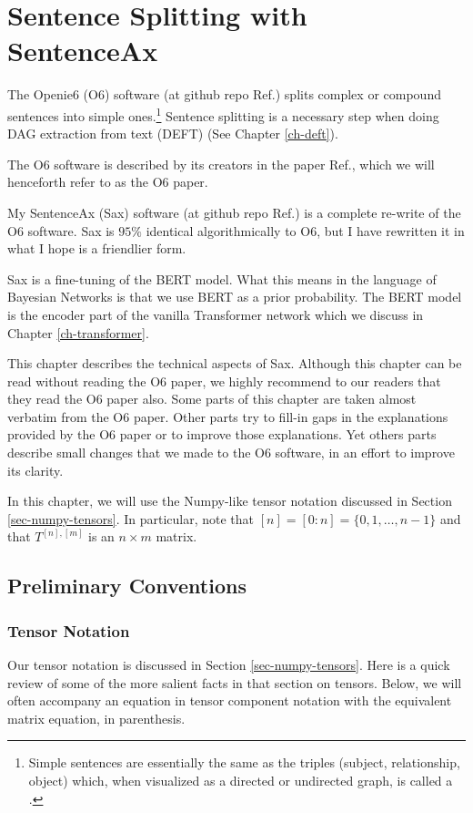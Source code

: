 \chapter{Sentence Splitting with SentenceAx}
\label{ch-sentence-ax}

The Openie6 (O6) software
(at github repo Ref.\cite{openie6-github})
splits complex or compound
sentences into
simple ones.\footnote{Simple sentences are essentially
the same  as the triples (subject, relationship, object) which, when visualized as a directed or undirected graph,
is called a  .} Sentence splitting is a necessary step
 when doing
DAG extraction from text (DEFT) (See Chapter \ref{ch-deft}).

The O6 software is described by its creators
 in the paper Ref.\cite{openie6-paper},
 which we will henceforth refer to as
 the O6 paper.

My SentenceAx (Sax) software (at github repo Ref.\cite{sentence-ax-github}) is a complete re-write of
the  O6 software.
Sax is $95\%$ identical algorithmically to O6, but I have rewritten it in what I hope is a friendlier form.


 Sax is a fine-tuning of the BERT model.
 What this means in the
 language of Bayesian
 Networks is that we use
 BERT as a prior
 probability.
 The BERT model is the encoder part of the
 vanilla Transformer network which
 we discuss in Chapter \ref{ch-transformer}.

 This chapter describes the technical
 aspects of Sax. Although this chapter
 can be read without reading the O6 paper, we highly recommend to
 our readers that they read the O6 paper also.
 Some parts of this chapter are taken almost verbatim
 from the O6 paper. Other parts try to fill-in gaps in the
 explanations provided by the O6 paper or to improve those explanations. Yet others parts describe small changes that we made to the O6 software, in an effort to improve its clarity.




 In this chapter, we
 will use the Numpy-like tensor notation
 discussed in Section
 \ref{sec-numpy-tensors}. In particular, note that $[n] = [0:n] = \{0, 1,\ldots, n-1\}$ and that $T^{[n], [m]}$ is an $n\times m$ matrix.

\section{Preliminary Conventions}

\subsection{Tensor Notation}
Our tensor notation is discussed in Section
\ref{sec-numpy-tensors}.
Here is a quick review
of some of the more salient
facts in that section on tensors.
Below, we will often accompany
  an equation in tensor
  component notation
  with the equivalent matrix equation,
  in parenthesis.

